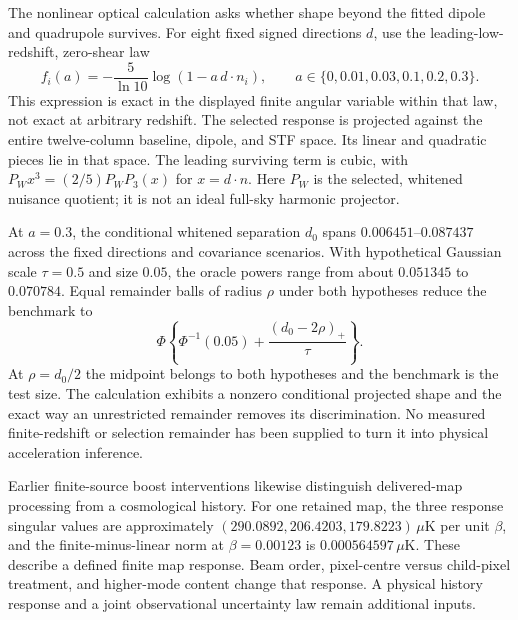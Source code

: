 The nonlinear optical calculation asks whether shape beyond the fitted dipole and quadrupole survives. For eight fixed signed directions $d$, use the leading-low-redshift, zero-shear law
\begin{equation}
 f_i(a)=-\frac5{\ln10}\log(1-a\,d\cdot n_i),\qquad
 a\in\{0,0.01,0.03,0.1,0.2,0.3\}.
 \label{eq:nonlinear}
\end{equation}
This expression is exact in the displayed finite angular variable within that law, not exact at arbitrary redshift. The selected response is projected against the entire twelve-column baseline, dipole, and STF space. Its linear and quadratic pieces lie in that space. The leading surviving term is cubic, with $P_Wx^3=(2/5)P_WP_3(x)$ for $x=d\cdot n$. Here $P_W$ is the selected, whitened nuisance quotient; it is not an ideal full-sky harmonic projector.

At $a=0.3$, the conditional whitened separation $d_0$ spans $0.006451$--$0.087437$ across the fixed directions and covariance scenarios. With hypothetical Gaussian scale $\tau=0.5$ and size $0.05$, the oracle powers range from about $0.051345$ to $0.070784$. Equal remainder balls of radius $\rho$ under both hypotheses reduce the benchmark to
\begin{equation}
 \Phi\left\{\Phi^{-1}(0.05)+\frac{(d_0-2\rho)_+}{\tau}\right\}.
 \label{eq:overlappower}
\end{equation}
At $\rho=d_0/2$ the midpoint belongs to both hypotheses and the benchmark is the test size. The calculation exhibits a nonzero conditional projected shape and the exact way an unrestricted remainder removes its discrimination. No measured finite-redshift or selection remainder has been supplied to turn it into physical acceleration inference.

Earlier finite-source boost interventions likewise distinguish delivered-map processing from a cosmological history. For one retained map, the three response singular values are approximately $(290.0892,206.4203,179.8223)\,\mu\mathrm K$ per unit $\beta$, and the finite-minus-linear norm at $\beta=0.00123$ is $0.000564597\,\mu\mathrm K$. These describe a defined finite map response. Beam order, pixel-centre versus child-pixel treatment, and higher-mode content change that response. A physical history response and a joint observational uncertainty law remain additional inputs.
